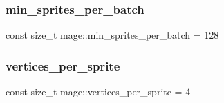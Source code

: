 \hypertarget{namespacemage_aecf83c1102c47ecde72f662c43f9722f}{}\label{namespacemage_aecf83c1102c47ecde72f662c43f9722f} 
\subsubsection{\texorpdfstring{min\+\_\+sprites\+\_\+per\+\_\+batch}{min\_sprites\_per\_batch}}
{\footnotesize\ttfamily const size\+\_\+t mage\+::min\+\_\+sprites\+\_\+per\+\_\+batch = 128\hspace{0.3cm}{\ttfamily [static]}}

\hypertarget{namespacemage_ad48c52817a0e8892e21bd053cce611ed}{}\label{namespacemage_ad48c52817a0e8892e21bd053cce611ed} 
\subsubsection{\texorpdfstring{vertices\+\_\+per\+\_\+sprite}{vertices\_per\_sprite}}
{\footnotesize\ttfamily const size\+\_\+t mage\+::vertices\+\_\+per\+\_\+sprite = 4\hspace{0.3cm}{\ttfamily [static]}}

